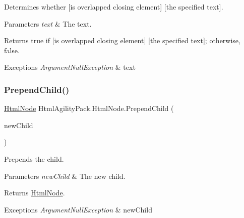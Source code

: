 Determines whether \mbox{[}is overlapped closing element\mbox{]} \mbox{[}the specified text\mbox{]}. 


\begin{DoxyParams}{Parameters}
{\em text} & The text.\\
\hline
\end{DoxyParams}
\begin{DoxyReturn}{Returns}
{\ttfamily true} if \mbox{[}is overlapped closing element\mbox{]} \mbox{[}the specified text\mbox{]}; otherwise, {\ttfamily false}.
\end{DoxyReturn}

\begin{DoxyExceptions}{Exceptions}
{\em Argument\+Null\+Exception} & text\\
\hline
\end{DoxyExceptions}
\mbox{\label{class_html_agility_pack_1_1_html_node_a9319d4e8401526a1c22e3cf68591a647}} 
\subsubsection{\texorpdfstring{Prepend\+Child()}{PrependChild()}}
{\footnotesize\ttfamily \hyperlink{class_html_agility_pack_1_1_html_node}{Html\+Node} Html\+Agility\+Pack.\+Html\+Node.\+Prepend\+Child (\begin{DoxyParamCaption}\item[{\hyperlink{class_html_agility_pack_1_1_html_node}{Html\+Node}}]{new\+Child }\end{DoxyParamCaption})\hspace{0.3cm}{\ttfamily [inline]}}



Prepends the child. 


\begin{DoxyParams}{Parameters}
{\em new\+Child} & The new child.\\
\hline
\end{DoxyParams}
\begin{DoxyReturn}{Returns}
\hyperlink{class_html_agility_pack_1_1_html_node}{Html\+Node}.
\end{DoxyReturn}

\begin{DoxyExceptions}{Exceptions}
{\em Argument\+Null\+Exception} & new\+Child\\
\hline
\end{DoxyExceptions}
\mbox{\label{class_html_agility_pack_1_1_html_node_a8baeef167ff771ed219dbb9e39518994}} 
